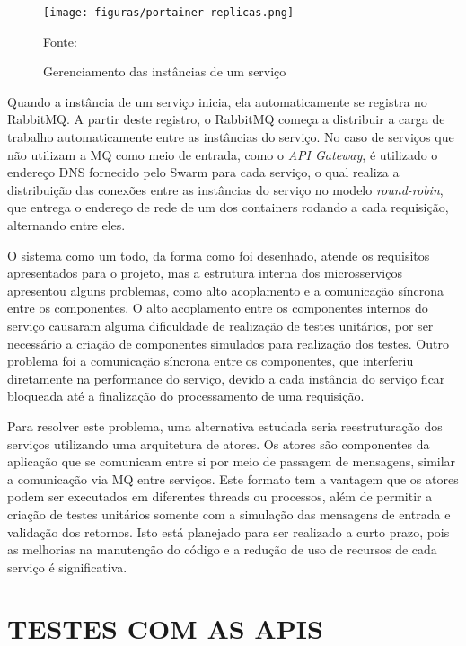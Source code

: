 \begin{figure}[H]
	\centering
	\caption{Gerenciamento das instâncias de um serviço}
	\texttt{[image: figuras/portainer-replicas.png]}

	\label{fig:portainer-replicas}
	\footnotesize Fonte: \fonteOAutor
\end{figure}

Quando a instância de um serviço inicia, ela automaticamente se registra
no RabbitMQ. A partir deste registro, o RabbitMQ começa a distribuir a carga
de trabalho automaticamente entre as instâncias do serviço. No caso de
serviços que não utilizam a \ac{MQ} como meio de entrada, como o
\emph{API Gateway}, é utilizado o endereço \ac{DNS} fornecido pelo Swarm
para cada serviço, o qual realiza a distribuição das conexões entre as
instâncias do serviço no modelo \emph{round-robin}, que entrega o
endereço de rede de um dos containers rodando a cada requisição, alternando
entre eles.

O sistema como um todo, da forma como foi desenhado, atende os requisitos
apresentados para o projeto, mas a estrutura interna dos microsserviços
apresentou alguns problemas, como alto acoplamento e a comunicação síncrona
entre os componentes. O alto acoplamento entre os componentes internos do
serviço causaram alguma dificuldade de realização de testes unitários, por
ser necessário a criação de componentes simulados para realização dos testes.
Outro problema foi a comunicação síncrona entre os componentes, que
interferiu diretamente na performance do serviço, devido a cada instância do
serviço ficar bloqueada até a finalização do processamento de uma requisição.

Para resolver este problema, uma alternativa estudada seria reestruturação
dos serviços utilizando uma arquitetura de atores. Os atores são componentes
da aplicação que se comunicam entre si por meio de passagem de mensagens,
similar a comunicação via \ac{MQ} entre serviços. Este formato tem a vantagem
que os atores podem ser executados em diferentes threads ou processos,
além de permitir a criação de testes unitários somente com a simulação das
mensagens de entrada e validação dos retornos. Isto está planejado para ser
realizado a curto prazo, pois as melhorias na manutenção do código e a
redução de uso de recursos de cada serviço é significativa.

\section{TESTES COM AS APIS}

